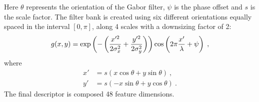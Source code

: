 \begin{description}
Here $\theta$ represents the orientation of the Gabor filter, $\psi$ is the phase offset and $s$ is the scale factor. 
The filter bank is created using six different orientations equally spaced in the interval $[0, \pi]$, along 4 scales with a downsizing factor of 2:
\begin{equation}\scriptsize
  \label{Eq:Gabor}
  g(x,y) = \exp{ \left(-\left( \frac{x'^{2}}{2\sigma_{x}^{2}}+\frac{y'^{2}}{2\sigma_{y}^{2}} \right) \right)} \cos\left( 2\pi\frac{x'}{\lambda}+\psi \right) \ , 
\end{equation}
\noindent where
\begin{align*}
  x' &= s\left( x\cos\theta+y\sin\theta\right) \ ,  \\
  y' &= s\left( -x\sin\theta +y\cos\theta\right) \ .
\end{align*}
The final descriptor is composed 48 feature dimensions.
\end{description}



